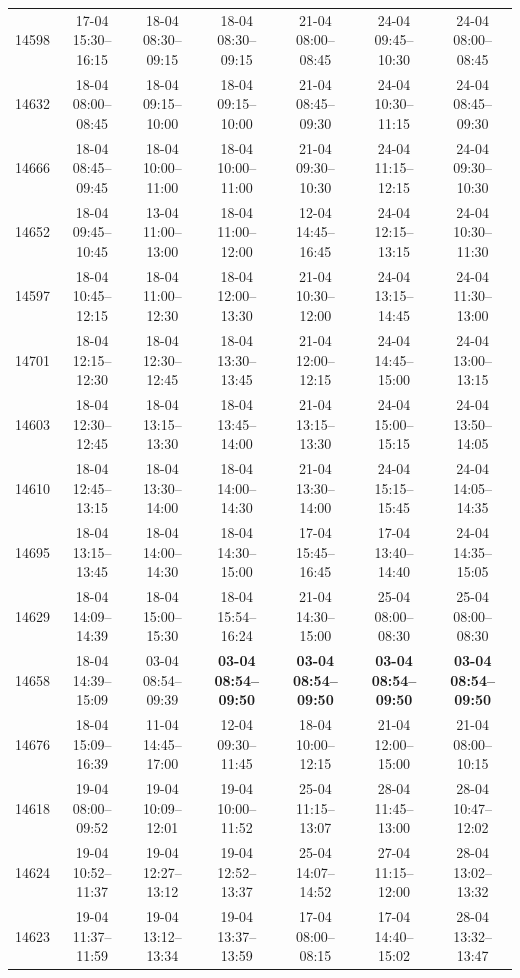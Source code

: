 \begin{table}[htbp]
\begin{tabular}{|r|c|c|c|c|c|c|}
14598 & 17-04 15:30--16:15 & 18-04 08:30--09:15 & 18-04 08:30--09:15 & 21-04 08:00--08:45 & 24-04 09:45--10:30 & 24-04 08:00--08:45 \\ 
14632 & 18-04 08:00--08:45 & 18-04 09:15--10:00 & 18-04 09:15--10:00 & 21-04 08:45--09:30 & 24-04 10:30--11:15 & 24-04 08:45--09:30 \\ 
14666 & 18-04 08:45--09:45 & 18-04 10:00--11:00 & 18-04 10:00--11:00 & 21-04 09:30--10:30 & 24-04 11:15--12:15 & 24-04 09:30--10:30 \\ 
14652 & 18-04 09:45--10:45 & 13-04 11:00--13:00 & 18-04 11:00--12:00 & 12-04 14:45--16:45 & 24-04 12:15--13:15 & 24-04 10:30--11:30 \\ 
14597 & 18-04 10:45--12:15 & 18-04 11:00--12:30 & 18-04 12:00--13:30 & 21-04 10:30--12:00 & 24-04 13:15--14:45 & 24-04 11:30--13:00 \\ 
14701 & 18-04 12:15--12:30 & 18-04 12:30--12:45 & 18-04 13:30--13:45 & 21-04 12:00--12:15 & 24-04 14:45--15:00 & 24-04 13:00--13:15 \\ 
14603 & 18-04 12:30--12:45 & 18-04 13:15--13:30 & 18-04 13:45--14:00 & 21-04 13:15--13:30 & 24-04 15:00--15:15 & 24-04 13:50--14:05 \\ 
14610 & 18-04 12:45--13:15 & 18-04 13:30--14:00 & 18-04 14:00--14:30 & 21-04 13:30--14:00 & 24-04 15:15--15:45 & 24-04 14:05--14:35 \\ 
14695 & 18-04 13:15--13:45 & 18-04 14:00--14:30 & 18-04 14:30--15:00 & 17-04 15:45--16:45 & 17-04 13:40--14:40 & 24-04 14:35--15:05 \\ 
14629 & 18-04 14:09--14:39 & 18-04 15:00--15:30 & 18-04 15:54--16:24 & 21-04 14:30--15:00 & 25-04 08:00--08:30 & 25-04 08:00--08:30 \\ 
14658 & 18-04 14:39--15:09 & 03-04 08:54--09:39 & \textbf{03-04 08:54--09:50} & \textbf{03-04 08:54--09:50} & \textbf{03-04 08:54--09:50} & \textbf{03-04 08:54--09:50} \\ 
14676 & 18-04 15:09--16:39 & 11-04 14:45--17:00 & 12-04 09:30--11:45 & 18-04 10:00--12:15 & 21-04 12:00--15:00 & 21-04 08:00--10:15 \\ 
14618 & 19-04 08:00--09:52 & 19-04 10:09--12:01 & 19-04 10:00--11:52 & 25-04 11:15--13:07 & 28-04 11:45--13:00 & 28-04 10:47--12:02 \\ 
14624 & 19-04 10:52--11:37 & 19-04 12:27--13:12 & 19-04 12:52--13:37 & 25-04 14:07--14:52 & 27-04 11:15--12:00 & 28-04 13:02--13:32 \\ 
14623 & 19-04 11:37--11:59 & 19-04 13:12--13:34 & 19-04 13:37--13:59 & 17-04 08:00--08:15 & 17-04 14:40--15:02 & 28-04 13:32--13:47 \\ 

\end{tabular}
\end{table}
